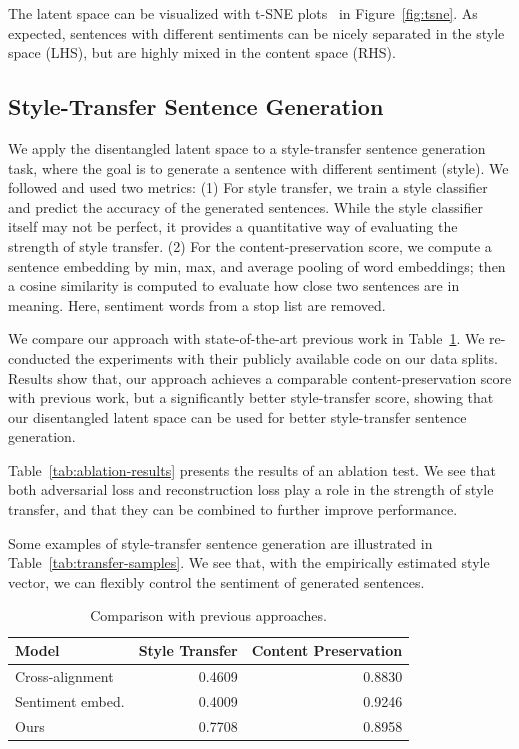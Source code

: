 The latent space can be visualized with t-SNE plots~\cite{maaten2008visualizing} in Figure~\ref{fig:tsne}. As expected, sentences with different sentiments can be nicely separated in the style space (LHS), but are highly mixed in the content space (RHS).


\subsection{Style-Transfer Sentence Generation}

We apply the disentangled latent space to a style-transfer sentence generation task, where the goal is to generate a sentence with different sentiment (style). We followed \cite{fu2017style} and used two metrics: (1) For style transfer, we train a style classifier and predict the accuracy of the generated sentences. While the style classifier itself may not be perfect, it provides a quantitative way of evaluating the strength of style transfer. (2) For the content-preservation score, we compute a sentence embedding by min, max, and average pooling of word embeddings; then a cosine similarity is computed to evaluate how close two sentences are in meaning. Here, sentiment words from a stop list \cite{hu2004mining} are removed.

We compare our approach with state-of-the-art previous work in Table~\ref{tab:comparison-previous}. We re-conducted the experiments with their publicly available code on our data splits.
Results show that, our approach achieves a comparable content-preservation score with previous work, but a significantly better style-transfer score, showing that our disentangled latent space can be used for better style-transfer sentence generation.

Table~\ref{tab:ablation-results} presents the results of an ablation test. We see that both adversarial loss and reconstruction loss play a role in the strength of style transfer, and that they can be combined to further improve performance.

Some examples of style-transfer sentence generation are illustrated in Table~\ref{tab:transfer-samples}. We see that, with the empirically estimated style vector, we can flexibly control the sentiment of generated sentences.

\begin{table}[!t]
	\centering
	\begin{tabular}{| l | r | r | }
		\hline
		\textbf{Model}                       & \textbf{Style Transfer} & \textbf{Content Preservation} \\
		\hline
		\hline
		Cross-alignment \citep{shen2017style} & 0.4609                  & 0.8830                        \\
		\hline
		Sentiment embed. \citep{fu2017style}  & 0.4009                  & 0.9246                        \\
		\hline
		Ours                                 & 0.7708                  & 0.8958                        \\
		\hline
	\end{tabular}
	\caption{Comparison with previous approaches.}
	\label{tab:comparison-previous}
\end{table}


